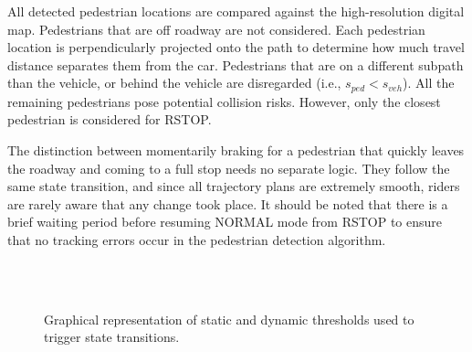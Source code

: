 \documentclass[letterpaper, 10 pt, conference]{ieeeconf}  %
\begin{document}
All detected pedestrian locations are compared against the high-resolution digital map. Pedestrians that are off roadway are not considered.
Each pedestrian location is perpendicularly projected onto the path to determine how much travel distance separates them from the car.
Pedestrians that are on a different subpath than the vehicle, or behind the vehicle are disregarded (i.e., $s_{ped} < s_{veh}$).
All the remaining pedestrians pose potential collision risks. However, only the closest pedestrian is considered for RSTOP.

The distinction between momentarily braking for a pedestrian that quickly leaves the roadway and coming to a full stop needs no separate logic.
They follow the same state transition, and since all trajectory plans are extremely smooth, riders are rarely aware that any change took place.
It should be noted that there is a brief waiting period before resuming NORMAL mode from RSTOP to ensure that no tracking errors occur in the pedestrian detection algorithm.

\begin{figure}[tb]
\centering
  \\
  \\
  \caption{Graphical representation of static and dynamic thresholds used to trigger state transitions.}
  \label{fig:react}
\end{figure}
\end{document}
